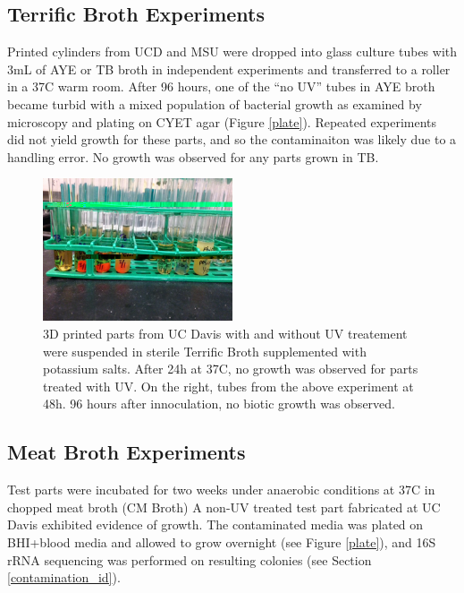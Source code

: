 \documentclass[fleqn,10pt]{wlpeerj}
\begin{document}
\subsection{Terrific Broth Experiments}

Printed cylinders from UCD and MSU were dropped into glass culture tubes with
3mL of AYE or TB broth in independent experiments and transferred to a roller
in a 37C warm room. After 96 hours, one of the ``no UV'' tubes in AYE broth
became turbid with a mixed population of bacterial growth as examined by
microscopy and plating on CYET agar (Figure \ref{plate}). Repeated experiments
did not yield growth for these parts, and so the contaminaiton was likely due
to a handling error. No growth was observed for any parts grown in TB.

\begin{figure}[!h]
  \centering
    \includegraphics[width=0.5\textwidth]{terrific_broth}
    
    \caption{3D printed parts from UC Davis with and without UV treatement
    were suspended in sterile Terrific Broth supplemented with potassium
    salts. After 24h at 37C, no growth was observed for parts treated with
    UV. On the right, tubes from the above experiment at 48h. 96 hours after
    innoculation, no biotic growth was observed.}

\end{figure}

\subsection{Meat Broth Experiments}\label{meat_broth}

Test parts were incubated for two weeks under anaerobic conditions at 37C in
chopped meat broth (CM Broth) \cite{seaweed_human_gut} A non-UV treated test
part fabricated at UC Davis exhibited evidence of growth. The contaminated
media was plated on BHI+blood media and allowed to grow overnight (see Figure
\ref{plate}), and 16S rRNA sequencing was performed on resulting colonies (see
Section \ref{contamination_id}).
\end{document}
